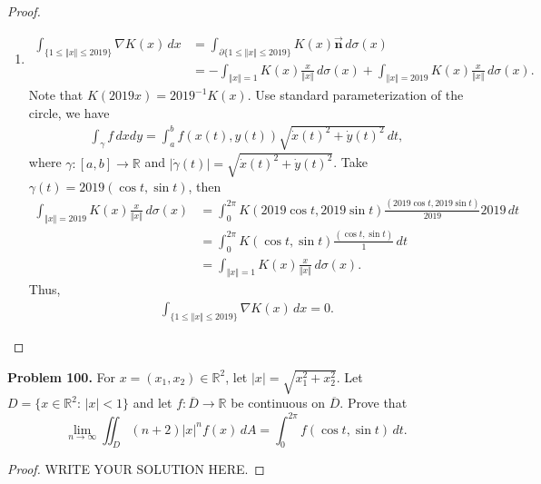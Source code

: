 \documentclass[11pt]{article}
\theoremstyle{definition}
\theoremstyle{definition}
\begin{document}
\begin{proof}
\begin{enumerate}[label=(\alph*)]
    \item 
    \begin{align*}
        \int_{\{1\leq \Vert x\Vert\leq 2019\}} \nabla K(x)\, dx & = \int_{\partial \{1\leq \Vert x\Vert\leq 2019\}} K(x)\vec{\mathbf{n}}\, d\sigma(x) \\
        & = - \int_{\Vert x\Vert = 1} K(x) \frac{x}{\Vert x\Vert}\, d\sigma(x) + \int_{\Vert x\Vert = 2019} K(x) \frac{x}{\Vert x\Vert}\, d\sigma(x).
    \end{align*}
    Note that $K(2019 x) = 2019^{-1} K(x)$. Use standard parameterization of the circle, we have
    \begin{align*}
        \int_{\gamma} f\, dx dy = \int^b_a f(x(t), y(t)) \sqrt{\Dot{x}(t)^2 + \Dot{y}(t)^2} \, dt,
    \end{align*}
    where $\gamma: [a,b] \to \mathbb{R}$ and $|\Dot{\gamma}(t)| = \sqrt{\Dot{x}(t)^2 + \Dot{y}(t)^2}$. Take $\gamma(t) = 2019 (\cos t, \sin t)$, then 
    \begin{align*}
        \int_{\Vert x\Vert = 2019} K(x) \frac{x}{\Vert x\Vert}\, d\sigma(x) & = \int^{2\pi}_0 K(2019 \cos t, 2019 \sin t) \frac{(2019 \cos t, 2019 \sin t)}{2019} 2019 \, dt \\
        & = \int^{2\pi}_0 K(\cos t, \sin t) \frac{(\cos t, \sin t)}{1} \, dt \\
        & = \int_{\Vert x\Vert = 1} K(x) \frac{x}{\Vert x\Vert}\, d\sigma(x).
    \end{align*}
    Thus, 
    \begin{align*}
        \int_{\{1\leq \Vert x\Vert\leq 2019\}} \nabla K(x)\, dx = 0.
    \end{align*}
\end{enumerate}
\end{proof}


\medskip


\noindent
{\bf Problem 100.}
 For $x=(x_1,x_2)\in\mathbb{R}^2$, let $|x|=\sqrt{x_1^2+x_2^2}$.
Let $D=\{x\in\mathbb{R}^2:\, |x|< 1\}$ and let $f:\overline{D}\to\mathbb{R}$ be continuous on $\overline{D}$. Prove that
$$
\lim_{n\to\infty} \iint_D (n+2)|x|^n f(x)\, dA=\int_0^{2\pi} f(\cos t,\sin t)\, dt.
$$
\begin{proof}
	WRITE YOUR SOLUTION HERE.
\end{proof}

\newpage


\end{document}

